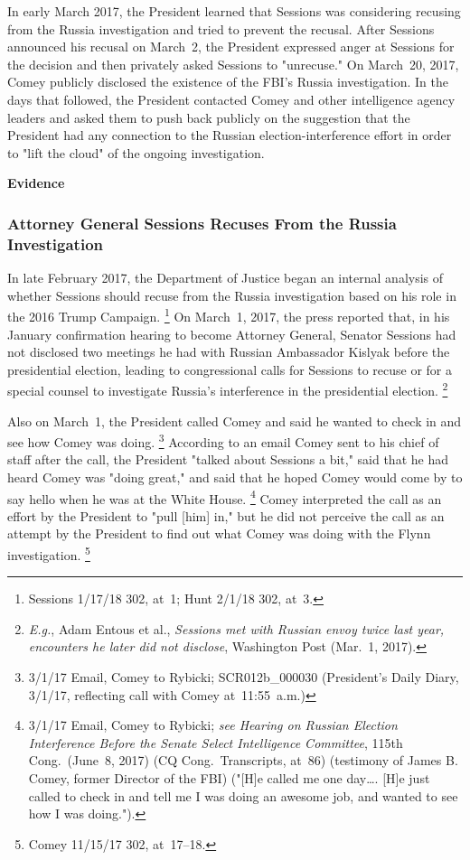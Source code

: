 In early March 2017, the President learned that Sessions was considering recusing from the Russia investigation and tried to prevent the recusal.
After Sessions announced his recusal on March~2, the President expressed anger at Sessions for the decision and then privately asked Sessions to "unrecuse."
On March~20, 2017, Comey publicly disclosed the existence of the FBI's Russia investigation.
In the days that followed, the President contacted Comey and other intelligence agency leaders and asked them to push back publicly on the suggestion that the President had any connection to the Russian election-interference effort in order to "lift the cloud" of the ongoing investigation.

\begin{center}
\textbf{Evidence}
\end{center}

\subsubsection{Attorney General Sessions Recuses From the Russia Investigation}

In late February 2017, the Department of Justice began an internal analysis of whether Sessions should recuse from the Russia investigation based on his role in the 2016 Trump Campaign.%
\footnote{Sessions 1/17/18 302, at~1;
Hunt 2/1/18 302, at~3.}
On March~1, 2017, the press reported that, in his January confirmation hearing to become Attorney General, Senator Sessions had not disclosed two meetings he had with Russian Ambassador Kislyak before the presidential election, leading to congressional calls for Sessions to recuse or for a special counsel to investigate Russia's interference in the presidential election.%
\footnote{\textit{E.g.}, Adam Entous et al., \textit{Sessions met with Russian envoy twice last year, encounters he later did not disclose}, Washington Post (Mar.~1, 2017).}

Also on March~1, the President called Comey and said he wanted to check in and see how Comey was doing.%
\footnote{3/1/17 Email, Comey to Rybicki;
SCR012b\_000030 (President's Daily Diary, 3/1/17, reflecting call with Comey at~11:55~a.m.)}
According to an email Comey sent to his chief of staff after the call, the President "talked about Sessions a bit," said that he had heard Comey was "doing great," and said that he hoped Comey would come by to say hello when he was at the White House.%
\footnote{3/1/17 Email, Comey to Rybicki;
\textit{see Hearing on Russian Election Interference Before the Senate Select Intelligence Committee}, 115th Cong.\ (June~8, 2017) (CQ Cong.\ Transcripts, at~86) (testimony of James B. Comey, former Director of the FBI) ("[H]e called me one day\dots. [H]e just called to check in and tell me I was doing an awesome job, and wanted to see how I was doing.").}
Comey interpreted the call as an effort by the President to "pull [him] in," but he did not perceive the call as an attempt by the President to find out what Comey was doing with the Flynn investigation.%
\footnote{Comey 11/15/17 302, at~17--18.}

